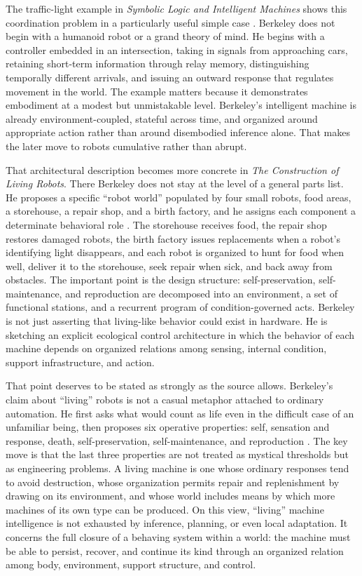 \documentclass[11pt]{article}
\begin{document}
The traffic-light example in \emph{Symbolic Logic and Intelligent Machines} shows this coordination problem in a particularly useful simple case \citep[pp.~62--66]{berkeley1959symbolic}. Berkeley does not begin with a humanoid robot or a grand theory of mind. He begins with a controller embedded in an intersection, taking in signals from approaching cars, retaining short-term information through relay memory, distinguishing temporally different arrivals, and issuing an outward response that regulates movement in the world. The example matters because it demonstrates embodiment at a modest but unmistakable level. Berkeley's intelligent machine is already environment-coupled, stateful across time, and organized around appropriate action rather than around disembodied inference alone. That makes the later move to robots cumulative rather than abrupt.

That architectural description becomes more concrete in \emph{The Construction of Living Robots}. There Berkeley does not stay at the level of a general parts list. He proposes a specific ``robot world'' populated by four small robots, food areas, a storehouse, a repair shop, and a birth factory, and he assigns each component a determinate behavioral role \citep{berkeley1952livingrobots}. The storehouse receives food, the repair shop restores damaged robots, the birth factory issues replacements when a robot's identifying light disappears, and each robot is organized to hunt for food when well, deliver it to the storehouse, seek repair when sick, and back away from obstacles. The important point is the design structure: self-preservation, self-maintenance, and reproduction are decomposed into an environment, a set of functional stations, and a recurrent program of condition-governed acts. Berkeley is not just asserting that living-like behavior could exist in hardware. He is sketching an explicit ecological control architecture in which the behavior of each machine depends on organized relations among sensing, internal condition, support infrastructure, and action.

That point deserves to be stated as strongly as the source allows. Berkeley's claim about ``living'' robots is not a casual metaphor attached to ordinary automation. He first asks what would count as life even in the difficult case of an unfamiliar being, then proposes six operative properties: self, sensation and response, death, self-preservation, self-maintenance, and reproduction \citep{berkeley1952livingrobots}. The key move is that the last three properties are not treated as mystical thresholds but as engineering problems. A living machine is one whose ordinary responses tend to avoid destruction, whose organization permits repair and replenishment by drawing on its environment, and whose world includes means by which more machines of its own type can be produced. On this view, ``living'' machine intelligence is not exhausted by inference, planning, or even local adaptation. It concerns the full closure of a behaving system within a world: the machine must be able to persist, recover, and continue its kind through an organized relation among body, environment, support structure, and control.
\end{document}

